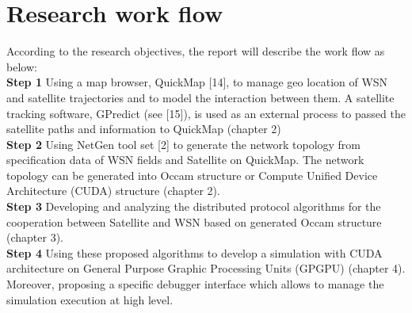 \section{Research work flow}
According to the research objectives, the report will describe the work flow as below: \\
\textbf{Step 1} Using a map browser, QuickMap [14], to manage geo location of WSN and satellite trajectories
and to model the interaction between them. A satellite tracking software, GPredict
(see [15]), is used as an external process to passed the satellite paths and information to
QuickMap (chapter 2) \\
\textbf{Step 2} Using NetGen tool set [2] to generate the network topology from specification data of
WSN fields and Satellite on QuickMap. The network topology can be generated into Occam
structure or Compute Unified Device Architecture (CUDA) structure (chapter 2). \\
\textbf{Step 3} Developing and analyzing the distributed protocol algorithms for the cooperation between
Satellite and WSN based on generated Occam structure (chapter 3). \\
\textbf{Step 4} Using these proposed algorithms to develop a simulation with CUDA architecture on
General Purpose Graphic Processing Units (GPGPU) (chapter 4). Moreover, proposing a
specific debugger interface which allows to manage the simulation execution at high level.

